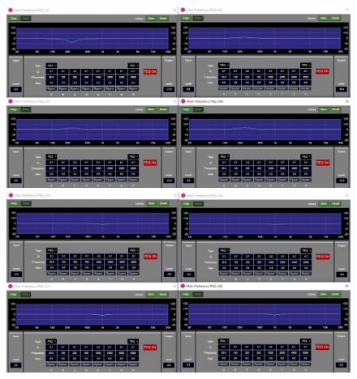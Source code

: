 \documentclass[11pt,a4j]{jreport}
\begin{document}
\newpage
{}
\begin{figure}[H]
  \begin{minipage}[b]{.5\linewidth}
    \centering
    \includegraphics[width=.9\linewidth]{images/experimentField/afcParameters/03gamma/05manualEQ6.jpg}
  \end{minipage}%
  \begin{minipage}[b]{.5\linewidth}
    \centering
    \includegraphics[width=.9\linewidth]{images/experimentField/afcParameters/03gamma/05manualEQ7.jpg}
  \end{minipage}


\end{figure}
\end{document}
